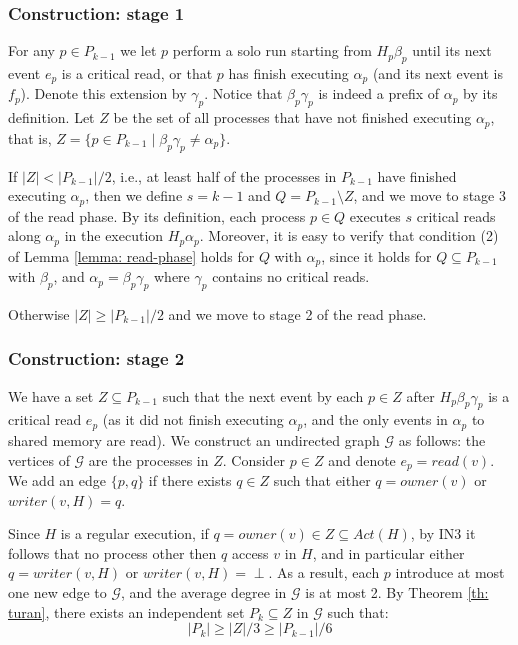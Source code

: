 \subsubsection{Construction: stage 1}
For any $p \in P_{k-1}$ we let $p$ perform a solo run starting from $H_p \beta_p$ until its next event $e_p$ is a critical read, or that $p$ has finish executing $\alpha_p$ (and its next event is $f_p$). Denote this extension by $\gamma_p$. Notice that $\beta_p \gamma_p$ is indeed a prefix of $\alpha_p$ by its definition.
Let $Z$ be the set of all processes that have not finished executing $\alpha_p$, that is, $Z = \{p \in P_{k-1} \mid \beta_p \gamma_p \neq \alpha_p\}$.

If $|Z|<|P_{k-1}|/2$, i.e., at least half of the processes in $P_{k-1}$ have finished executing $\alpha_p$, then we define $s=k-1$ and $Q = P_{k-1} \setminus Z$, and we move to stage 3 of the read phase.
By its definition, each process $p \in Q$ executes $s$ critical reads along $\alpha_p$ in the execution $H_p \alpha_p$. Moreover, it is easy to verify that condition (2) of Lemma \ref{lemma: read-phase} holds for $Q$ with $\alpha_p$, since it holds for $Q \subseteq P_{k-1}$ with $\beta_p$, and $\alpha_p = \beta_p \gamma_p$ where $\gamma_p$ contains no critical reads.

Otherwise $|Z| \geq |P_{k-1}|/2$ and we move to stage 2 of the read phase.


\subsubsection{Construction: stage 2}

We have a set $Z \subseteq P_{k-1}$ such that the next event by each $p \in Z$ after $H_p \beta_p \gamma_p$ is a critical read $e_p$ (as it did not finish executing $\alpha_p$, and the only events in $\alpha_p$ to shared memory are read).
We construct an undirected graph $\mathcal{G}$ as follows: the vertices of $\mathcal{G}$ are the processes in $Z$. Consider $p \in Z$ and denote $e_p = read(v)$. We add an edge $\{p,q\}$ if there exists $q \in Z$ such that either $q = owner(v)$ or $writer(v, H) = q$.

Since $H$ is a regular execution, if $q = owner(v) \in Z \subseteq Act(H)$, by IN3 it follows that no process other then $q$ access $v$ in $H$, and in particular either $q = writer(v,H)$ or $writer(v,H) = \perp$.
As a result, each $p$ introduce at most one new edge to $\mathcal{G}$, and the average degree in $\mathcal{G}$ is at most 2. By Theorem \ref{th: turan}, there exists an independent set $P_k \subseteq Z$ in $\mathcal{G}$ such that:
$$|P_k| \geq |Z|/3 \geq |P_{k-1}|/6$$

